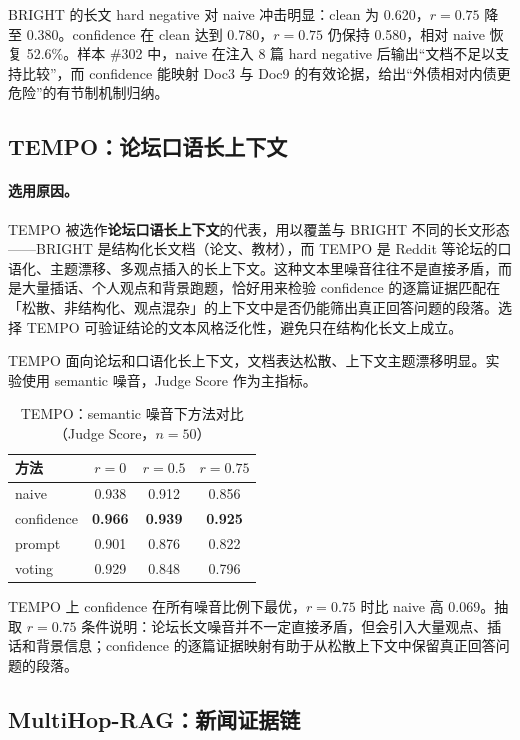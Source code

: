 \documentclass[UTF8,zihao=-4]{ctexart}
\begin{document}
BRIGHT 的长文 hard negative 对 naive 冲击明显：clean 为 0.620，$r=0.75$ 降至 0.380。confidence 在 clean 达到 0.780，$r=0.75$ 仍保持 0.580，相对 naive 恢复 52.6\%。样本 \#302 中，naive 在注入 8 篇 hard negative 后输出“文档不足以支持比较”，而 confidence 能映射 Doc3 与 Doc9 的有效论据，给出“外债相对内债更危险”的有节制机制归纳。

\subsection{TEMPO：论坛口语长上下文}

\paragraph{选用原因。} TEMPO 被选作\textbf{论坛口语长上下文}的代表，用以覆盖与 BRIGHT 不同的长文形态——BRIGHT 是结构化长文档（论文、教材），而 TEMPO 是 Reddit 等论坛的口语化、主题漂移、多观点插入的长上下文。这种文本里噪音往往不是直接矛盾，而是大量插话、个人观点和背景跑题，恰好用来检验 confidence 的逐篇证据匹配在「松散、非结构化、观点混杂」的上下文中是否仍能筛出真正回答问题的段落。选择 TEMPO 可验证结论的文本风格泛化性，避免只在结构化长文上成立。

TEMPO 面向论坛和口语化长上下文，文档表达松散、上下文主题漂移明显。实验使用 semantic 噪音，Judge Score 作为主指标。

\begin{table}[H]
  \centering
  \caption{TEMPO：semantic 噪音下方法对比（Judge Score，$n=50$）}
  \begin{tabular}{lccc}
    \toprule
    方法 & $r=0$ & $r=0.5$ & $r=0.75$ \\
    \midrule
    naive & 0.938 & 0.912 & 0.856 \\
    confidence & \textbf{0.966} & \textbf{0.939} & \textbf{0.925} \\
    prompt & 0.901 & 0.876 & 0.822 \\
    voting & 0.929 & 0.848 & 0.796 \\
    \bottomrule
  \end{tabular}
\end{table}

TEMPO 上 confidence 在所有噪音比例下最优，$r=0.75$ 时比 naive 高 0.069。抽取 $r=0.75$ 条件说明：论坛长文噪音并不一定直接矛盾，但会引入大量观点、插话和背景信息；confidence 的逐篇证据映射有助于从松散上下文中保留真正回答问题的段落。

\subsection{MultiHop-RAG：新闻证据链}
\end{document}
